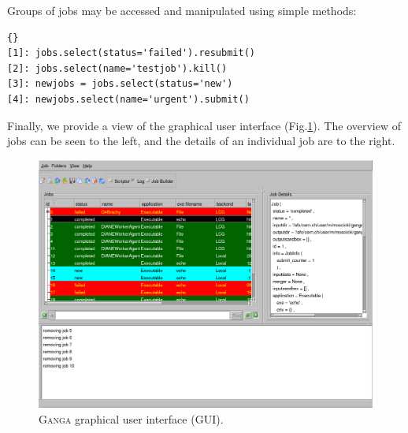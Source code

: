 \documentclass{elsart}
\def\ganga {\textsc{Ganga}\xspace}
\begin{document}
\vspace{-2ex}

Groups of jobs may be accessed and manipulated using simple methods:

\tiny
\begin{lstlisting}[escapechar=!]{}
[1]: jobs.select(status='failed').resubmit()
[2]: jobs.select(name='testjob').kill()
[3]: newjobs = jobs.select(status='new')
[4]: newjobs.select(name='urgent').submit()
\end{lstlisting}
\normalsize

\vspace{-2ex}

Finally, we provide a view of the graphical user interface
(Fig.\ref{fig:GUI}). The overview of jobs can be seen to the left, and the
details of an individual job are to the right.

\begin{figure}[ht!]
  \centering
  \includegraphics[width=1 \textwidth]{ganga-GUI.png}
  \caption{\ganga graphical user interface (GUI). }
  \label{fig:GUI}
\end{figure}
\end{document}
